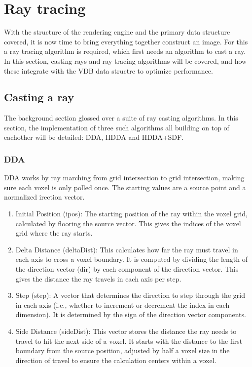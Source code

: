 
\section{Ray tracing}
With the structure of the rendering engine and the primary data structure covered, it is now time to bring everything together construct an image.
For this a ray tracing algorithm is required, which first needs an algorithm to cast a ray.
In this section, casting rays and ray-tracing algorithms will be covered, and how these integrate with the VDB data structre to optimize performance.

\subsection{Casting a ray}
The background section glossed over a suite of ray casting algorithms.
In this section, the implementation of three such algorithms all building on top of eachother will be detailed: DDA, HDDA and HDDA+SDF.

\subsubsection{DDA}
\acrshort{DDA} works by ray marching from grid intersection to grid intersection, making sure each voxel is only polled once.
The starting values are a source point and a normalized irection vector.
\begin{enumerate}
  \item Initial Position (ipos): The starting position of the ray within the voxel grid, calculated by flooring the source vector. This gives the indices of the voxel grid where the ray starts.
  \item Delta Distance (deltaDist): This calculates how far the ray must travel in each axis to cross a voxel boundary. It is computed by dividing the length of the direction vector (dir) by each component of the direction vector. This gives the distance the ray travels in each axis per step.
  \item Step (step): A vector that determines the direction to step through the grid in each axis (i.e., whether to increment or decrement the index in each dimension). It is determined by the sign of the direction vector components.
  \item Side Distance (sideDist): This vector stores the distance the ray needs to travel to hit the next side of a voxel. It starts with the distance to the first boundary from the source position, adjusted by half a voxel size in the direction of travel to ensure the calculation centers within a voxel.
\end{enumerate}

